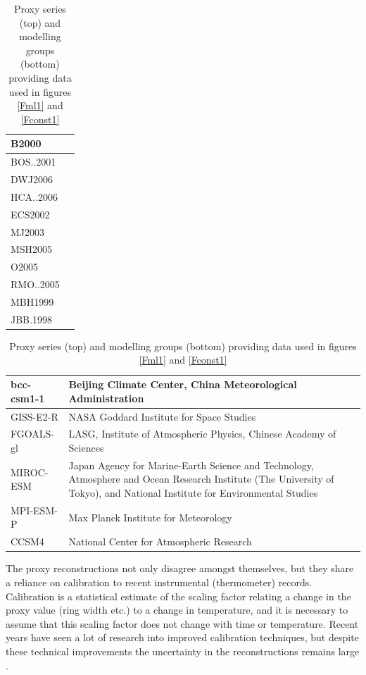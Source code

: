 \documentclass[CP]{copernicus}
\begin{document}
\begin{table}[!hbp]
\begin{tabular}{|p{3cm}|p{7cm}|}
\hline
B2000 & \citet{briffa00holocene,briffa04treerings} \\
\hline
BOS..2001 & \citet{briffa01ageband} \\
\hline
DWJ2006 & \citet{darrigo06context} \\
\hline
HCA..2006 & \citet{hegerl06climsens} \\
\hline
ECS2002 & \citet{esper02paleo,cook04millennium} \\
\hline
MJ2003 & \citet{mann03twok} \\
\hline
MSH2005 & \citet{moberg05proxy} \\
\hline
O2005 & \citet{oerlemans05climate} \\
\hline
RMO..2005 & \citet{rutherford05proxy} \\
\hline
MBH1999 & \citet{mann99} \\
\hline
JBB.1998 & \citet{jones98proxy,jones01millennium} \\
\hline
\end{tabular}

\vspace{0.5cm}
\begin{tabular}{|p{3cm}|p{7cm}|}
\hline
bcc-csm1-1 & Beijing Climate Center, China Meteorological Administration \\
\hline
GISS-E2-R & NASA Goddard Institute for Space Studies \\
\hline
FGOALS-gl & LASG, Institute of Atmospheric Physics, Chinese Academy of Sciences \\
\hline
MIROC-ESM & Japan Agency for Marine-Earth Science and Technology, Atmosphere and Ocean Research Institute (The University of Tokyo), and National Institute for Environmental Studies  \\
\hline
MPI-ESM-P & Max Planck Institute for Meteorology \\
\hline
CCSM4 & National Center for Atmospheric Research \\
\hline
\end{tabular}

\caption{Proxy series (top) and modelling groups (bottom) providing data used in figures \ref{Fml1} and \ref{Fconst1}}
\label{Tcredit}
\end{table}

The proxy reconstructions not only disagree amongst themselves, but they share a reliance on calibration to recent instrumental (thermometer) records. Calibration is a statistical estimate of the scaling factor relating a change in the proxy value (ring width etc.) to a change in temperature, and it is necessary to assume that this scaling factor does not change with time or temperature. Recent years have seen a lot of research into improved calibration techniques, but despite these technical improvements the uncertainty in the reconstructions remains large \citep{frank10noodle,jones09millennium}.
\end{document}
